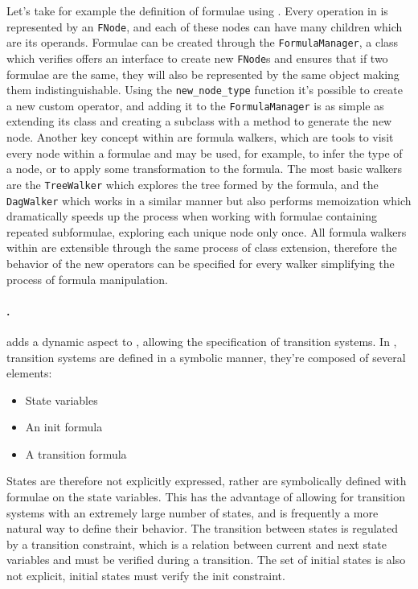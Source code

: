 Let's take for example the definition of formulae using \pysmt{}. Every operation in \pysmt{} is represented by an \texttt{FNode}, and each of these nodes can have many children which are its operands.
Formulae can be created through the \texttt{FormulaManager}, a class which verifies offers an interface to create new \texttt{FNode}s and ensures that if two formulae are the same, they will also be represented by the same \python{} object making them indistinguishable.
Using the \texttt{new\_node\_type} function it's possible to create a new custom operator, and adding it to the \texttt{FormulaManager} is as simple as extending its class and creating a subclass with a method to generate the new node.
Another key concept within \pysmt{} are formula walkers, which are tools to visit every node within a formulae and may be used, for example, to infer the type of a node, or to apply some transformation to the formula.
The most basic walkers are the \texttt{TreeWalker} which explores the tree formed by the formula, and the \texttt{DagWalker} which works in a similar manner but also performs memoization which dramatically speeds up the process when working with formulae containing repeated subformulae, exploring each unique node only once.
All formula walkers within \pysmt{} are extensible through the same process of class extension, therefore the behavior of the new operators can be specified for every walker simplifying the process of formula manipulation.

\paragraph*{\vmt{}.}
\VMT{} adds a dynamic aspect to \smt{}, allowing the specification of transition systems. In \vmt{}, transition systems are defined in a symbolic manner, they're composed of several elements:
\begin{itemize}
    \item State variables
    \item An init formula
    \item A transition formula
\end{itemize}
States are therefore not explicitly expressed, rather are symbolically defined with formulae on the state variables.
This has the advantage of allowing for transition systems with an extremely large number of states, and is frequently a more natural way to define their behavior.
The transition between states is regulated by a transition constraint, which is a relation between current and next state variables and must be verified during a transition. The set of initial states is also not explicit, initial states must verify the init constraint.


